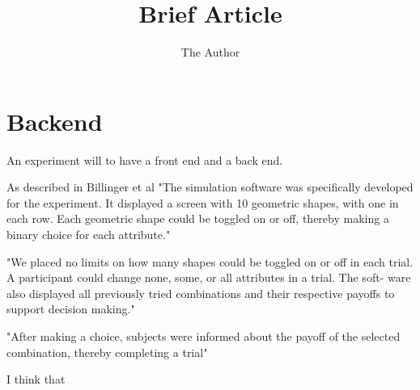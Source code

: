 \documentclass[11pt, oneside]{article}   	%
\title{Brief Article}
\author{The Author}
\begin{document}
\section{Backend}

An experiment will to have a front end and a back end.

As described in Billinger et al "The simulation software was specifically developed for the experiment. It displayed a screen with 10 geometric shapes, with one in each row. Each geometric shape could be toggled on or off, thereby making a binary choice for each attribute."

"We placed no limits on how many shapes could be toggled on or off in each trial. A participant could change none, some, or all attributes in a trial. The soft- ware also displayed all previously tried combinations and their respective payoffs to support decision making."

"After making a choice, subjects were informed about the payoff of the selected combination, thereby completing a trial"

I think that
\end{document}
